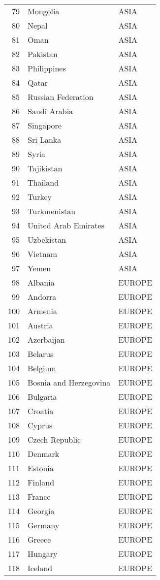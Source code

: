 \documentclass[11pt]{article}
\begin{document}
\begin{center}
\begin{tabular}{rll}
79 & Mongolia & ASIA\\
80 & Nepal & ASIA\\
81 & Oman & ASIA\\
82 & Pakistan & ASIA\\
83 & Philippines & ASIA\\
84 & Qatar & ASIA\\
85 & Russian Federation & ASIA\\
86 & Saudi Arabia & ASIA\\
87 & Singapore & ASIA\\
88 & Sri Lanka & ASIA\\
89 & Syria & ASIA\\
90 & Tajikistan & ASIA\\
91 & Thailand & ASIA\\
92 & Turkey & ASIA\\
93 & Turkmenistan & ASIA\\
94 & United Arab Emirates & ASIA\\
95 & Uzbekistan & ASIA\\
96 & Vietnam & ASIA\\
97 & Yemen & ASIA\\
98 & Albania & EUROPE\\
99 & Andorra & EUROPE\\
100 & Armenia & EUROPE\\
101 & Austria & EUROPE\\
102 & Azerbaijan & EUROPE\\
103 & Belarus & EUROPE\\
104 & Belgium & EUROPE\\
105 & Bosnia and Herzegovina & EUROPE\\
106 & Bulgaria & EUROPE\\
107 & Croatia & EUROPE\\
108 & Cyprus & EUROPE\\
109 & Czech Republic & EUROPE\\
110 & Denmark & EUROPE\\
111 & Estonia & EUROPE\\
112 & Finland & EUROPE\\
113 & France & EUROPE\\
114 & Georgia & EUROPE\\
115 & Germany & EUROPE\\
116 & Greece & EUROPE\\
117 & Hungary & EUROPE\\
118 & Iceland & EUROPE\\

\end{tabular}
\end{center}
\end{document}
